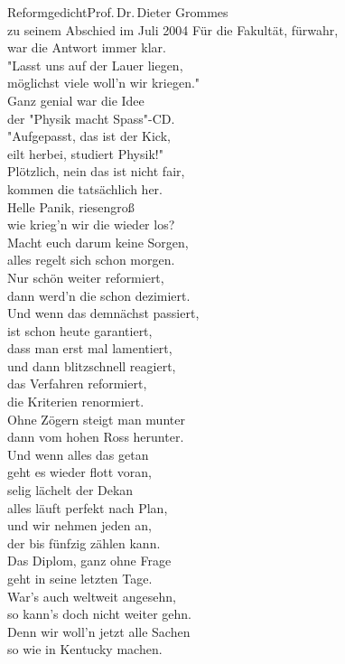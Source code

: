 \begin{lied*}{Reformgedicht}{Prof.\,Dr.\,Dieter Grommes\\zu seinem Abschied im Juli 2004}
Für die Fakultät, fürwahr,\\
war die Antwort immer klar.\\
"Lasst uns auf der Lauer liegen,\\
möglichst viele woll'n wir kriegen."\\
Ganz genial war die Idee\\
der "Physik macht Spass"-CD.\\
"Aufgepasst, das ist der Kick,\\
eilt herbei, studiert Physik!"\\

Plötzlich, nein das ist nicht fair,\\
kommen die tatsächlich her.\\
Helle Panik, riesengroß\\
wie krieg'n wir die wieder los?\\

Macht euch darum keine Sorgen,\\
alles regelt sich schon morgen.\\
Nur schön weiter reformiert,\\
dann werd'n die schon dezimiert.\\
Und wenn das demnächst passiert,\\
ist schon heute garantiert,\\
dass man erst mal lamentiert,\\
und dann blitzschnell reagiert,\\
das Verfahren reformiert,\\
die Kriterien renormiert.\\

Ohne Zögern steigt man munter\\
dann vom hohen Ross herunter.\\
Und wenn alles das getan\\
geht es wieder flott voran,\\
selig lächelt der Dekan\\
alles läuft perfekt nach Plan,\\
und wir nehmen jeden an,\\
der bis fünfzig zählen kann.\\

Das Diplom, ganz ohne Frage\\
geht in seine letzten Tage.\\
War's auch weltweit angesehn,\\
so kann's doch nicht weiter gehn.\\
Denn wir woll'n jetzt alle Sachen\\
so wie in Kentucky machen.\\


\end{lied*}
